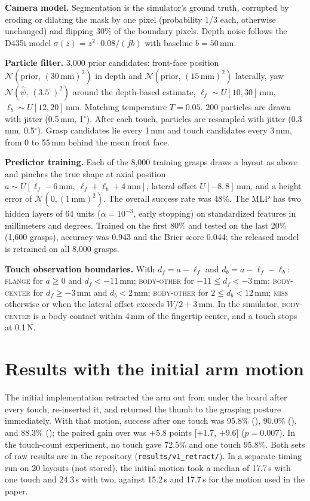 \textbf{Camera model.} Segmentation is the simulator's ground truth, corrupted by eroding or dilating the mask by one pixel (probability 1/3 each, otherwise unchanged) and flipping 30\% of the boundary pixels. Depth noise follows the D435i model $\sigma(z)=z^2\cdot0.08/(f b)$ with baseline $b=50$\,mm.

\textbf{Particle filter.} 3,000 prior candidates: front-face position $\mathcal{N}(\text{prior},\,(30\,\text{mm})^2)$ in depth and $\mathcal{N}(\text{prior},\,(15\,\text{mm})^2)$ laterally, yaw $\mathcal{N}(\hat\psi,\,(3.5^\circ)^2)$ around the depth-based estimate, $\ell_f\sim U[10,30]$\,mm, $\ell_b\sim U[12,20]$\,mm. Matching temperature $T=0.05$. 200 particles are drawn with jitter (0.5\,mm, 1$^\circ$). After each touch, particles are resampled with jitter (0.3\,mm, 0.5$^\circ$). Grasp candidates lie every 1\,mm and touch candidates every 3\,mm, from 0 to 55\,mm behind the mean front face.

\textbf{Predictor training.} Each of the 8,000 training grasps draws a layout as above and pinches the true shape at axial position $a\sim U[\ell_f-6\,\text{mm},\ \ell_f+\ell_b+4\,\text{mm}]$, lateral offset $U[-8,8]$\,mm, and a height error of $\mathcal{N}(0,(1\,\text{mm})^2)$. The overall success rate was 48\%. The MLP has two hidden layers of 64 units ($\alpha=10^{-3}$, early stopping) on standardized features in millimeters and degrees. Trained on the first 80\% and tested on the last 20\% (1,600 grasps), accuracy was 0.943 and the Brier score 0.044; the released model is retrained on all 8,000 grasps.

\textbf{Touch observation boundaries.} With $d_f=a-\ell_f$ and $d_b=a-\ell_f-\ell_b$: \textsc{flange} for $a\ge0$ and $d_f<-11$\,mm; \textsc{body-other} for $-11\le d_f<-3$\,mm; \textsc{body-center} for $d_f\ge-3$\,mm and $d_b<2$\,mm; \textsc{body-other} for $2\le d_b<12$\,mm; \textsc{miss} otherwise or when the lateral offset exceeds $W/2+3$\,mm. In the simulator, \textsc{body-center} is a body contact within 4\,mm of the fingertip center, and a touch stops at 0.1\,N.

\section{Results with the initial arm motion}\label{app:v1}
The initial implementation retracted the arm out from under the board after every touch, re-inserted it, and returned the thumb to the grasping posture immediately. With that motion, success after one touch was 95.8\% (\Ours), 90.0\% (\Unc), and 88.3\% (\Rand); the paired gain over \Unc{} was +5.8 points [+1.7, +9.6] ($p=0.007$). In the touch-count experiment, no touch gave 72.5\% and one touch 95.8\%. Both sets of raw results are in the repository (\texttt{results/v1\_retract/}). In a separate timing run on 20 layouts (not stored), the initial motion took a median of 17.7\,s with one touch and 24.3\,s with two, against 15.2\,s and 17.7\,s for the motion used in the paper.

